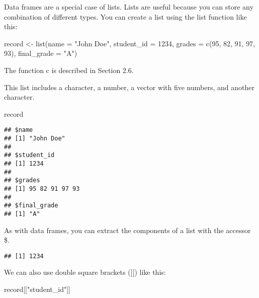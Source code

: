 \documentclass[
]{article}
\newenvironment{Shaded}{\begin{snugshade}}{\end{snugshade}}
\newcommand{\AttributeTok}[1]{\textcolor[rgb]{0.77,0.63,0.00}{#1}}
\newcommand{\DecValTok}[1]{\textcolor[rgb]{0.00,0.00,0.81}{#1}}
\newcommand{\FunctionTok}[1]{\textcolor[rgb]{0.00,0.00,0.00}{#1}}
\newcommand{\NormalTok}[1]{#1}
\newcommand{\OtherTok}[1]{\textcolor[rgb]{0.56,0.35,0.01}{#1}}
\newcommand{\SpecialCharTok}[1]{\textcolor[rgb]{0.00,0.00,0.00}{#1}}
\newcommand{\StringTok}[1]{\textcolor[rgb]{0.31,0.60,0.02}{#1}}
\begin{document}
Data frames are a special case of lists. Lists are useful because you
can store any combination of different types. You can create a list
using the list function like this:

\begin{Shaded}
\begin{Highlighting}[]
\NormalTok{record }\OtherTok{\textless{}{-}} \FunctionTok{list}\NormalTok{(}\AttributeTok{name =} \StringTok{"John Doe"}\NormalTok{,}
             \AttributeTok{student\_id =} \DecValTok{1234}\NormalTok{,}
             \AttributeTok{grades =} \FunctionTok{c}\NormalTok{(}\DecValTok{95}\NormalTok{, }\DecValTok{82}\NormalTok{, }\DecValTok{91}\NormalTok{, }\DecValTok{97}\NormalTok{, }\DecValTok{93}\NormalTok{),}
             \AttributeTok{final\_grade =} \StringTok{"A"}\NormalTok{)}
\end{Highlighting}
\end{Shaded}

The function c is described in Section 2.6.

This list includes a character, a number, a vector with five numbers,
and another character.

\begin{Shaded}
\begin{Highlighting}[]
\NormalTok{record}
\end{Highlighting}
\end{Shaded}

\begin{verbatim}
## $name
## [1] "John Doe"
## 
## $student_id
## [1] 1234
## 
## $grades
## [1] 95 82 91 97 93
## 
## $final_grade
## [1] "A"
\end{verbatim}

As with data frames, you can extract the components of a list with the
accessor \$.

\begin{Shaded}
\end{Shaded}

\begin{verbatim}
## [1] 1234
\end{verbatim}

We can also use double square brackets ({[}{[}) like this:

\begin{Shaded}
\begin{Highlighting}[]
\NormalTok{record[[}\StringTok{"student\_id"}\NormalTok{]]}
\end{Highlighting}
\end{Shaded}
\end{document}
